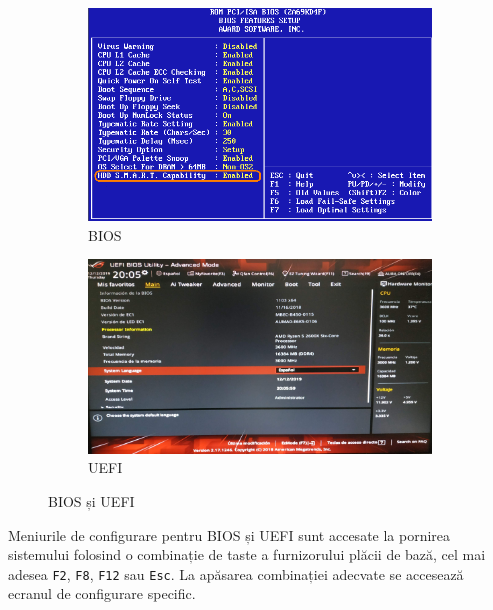 \begin{figure}[!htbp]
  \centering
  \begin{subfigure}[b]{0.8\textwidth}
    \includegraphics[width=\textwidth]{chapters/09-boot/img/bios.png}
    \caption{BIOS}
    \label{fig:intro:bios}
  \end{subfigure}

  \begin{subfigure}[b]{0.8\textwidth}
    \includegraphics[width=\textwidth]{chapters/09-boot/img/uefi.jpg}
    \caption{UEFI}
    \label{fig:boot:uefi}
  \end{subfigure}
  \caption{BIOS și UEFI}
  \label{fig:boot:bios-uefi}
\end{figure}

Meniurile de configurare pentru BIOS și UEFI sunt accesate la pornirea sistemului
folosind o combinație de taste a furnizorului plăcii de bază, cel mai adesea \texttt{F2}, \texttt{F8}, \texttt{F12}
sau \texttt{Esc}. La apăsarea combinației adecvate se accesează ecranul de configurare
specific.

